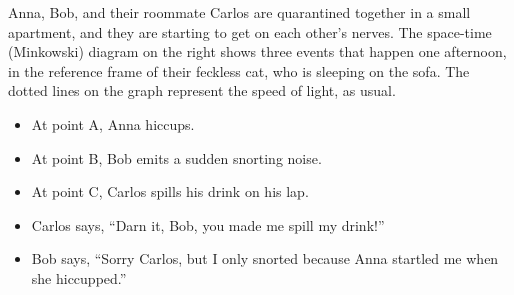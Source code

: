 \begin{Exercise}[difficulty=0]
Anna, Bob, and their roommate Carlos are quarantined together in a small apartment, and they are starting to get on each other's nerves.  The space-time (Minkowski) diagram on the right shows three events that happen one afternoon, in the reference frame of their feckless cat, who is sleeping on the sofa.  The dotted lines on the graph represent the speed of light, as usual.

\begin{minipage}{0.55 \textwidth}
\begin{itemize}[nosep]
\item At point A, Anna hiccups.  
\item At point B, Bob emits a sudden snorting noise. 
\item At point C, Carlos spills his drink on his lap.  
\item Carlos says, ``Darn it, Bob, you made me spill my drink!''
\item Bob says, ``Sorry Carlos, but I only snorted because Anna startled me when she hiccupped.''
\end{itemize}

\bigskip


\end{minipage}
\end{Exercise}
